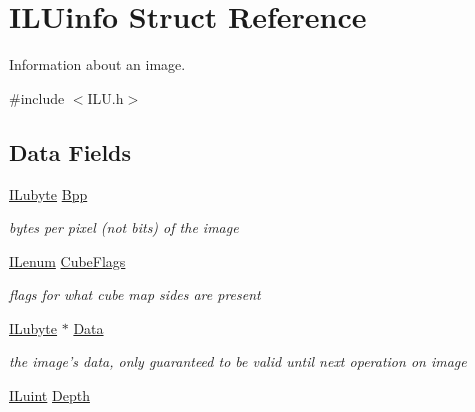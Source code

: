 \hypertarget{struct_i_l_uinfo}{\section{I\+L\+Uinfo Struct Reference}
\label{struct_i_l_uinfo}
}


Information about an image.  




{\ttfamily \#include $<$I\+L\+U.\+h$>$}

\subsection*{Data Fields}
\begin{DoxyCompactItemize}
\item 
\hypertarget{struct_i_l_uinfo_acb619433784a0e26c0f1f18b3700c9f7}{\hyperlink{group__il__types_ga057357939bc5a12e8061715453568519}{I\+Lubyte} \hyperlink{struct_i_l_uinfo_acb619433784a0e26c0f1f18b3700c9f7}{Bpp}}\label{struct_i_l_uinfo_acb619433784a0e26c0f1f18b3700c9f7}

\begin{DoxyCompactList}\small\item\em bytes per pixel (not bits) of the image \end{DoxyCompactList}\item 
\hypertarget{struct_i_l_uinfo_a2141dcf3ce36303a8c31d417d9337034}{\hyperlink{group__il__types_ga62ca73445716183ef42b1f3906a45ed0}{I\+Lenum} \hyperlink{struct_i_l_uinfo_a2141dcf3ce36303a8c31d417d9337034}{Cube\+Flags}}\label{struct_i_l_uinfo_a2141dcf3ce36303a8c31d417d9337034}

\begin{DoxyCompactList}\small\item\em flags for what cube map sides are present \end{DoxyCompactList}\item 
\hypertarget{struct_i_l_uinfo_a32fd28ac5d89e3ef2f9151330af0149d}{\hyperlink{group__il__types_ga057357939bc5a12e8061715453568519}{I\+Lubyte} $\ast$ \hyperlink{struct_i_l_uinfo_a32fd28ac5d89e3ef2f9151330af0149d}{Data}}\label{struct_i_l_uinfo_a32fd28ac5d89e3ef2f9151330af0149d}

\begin{DoxyCompactList}\small\item\em the image's data, only guaranteed to be valid until next operation on image \end{DoxyCompactList}\item 
\hypertarget{struct_i_l_uinfo_a2a4c47a9713bee335a0830b336bdc951}{\hyperlink{group__il__types_gaff8e86a1072c8d7cfe387fb87c6ed8e1}{I\+Luint} \hyperlink{struct_i_l_uinfo_a2a4c47a9713bee335a0830b336bdc951}{Depth}}\label{struct_i_l_uinfo_a2a4c47a9713bee335a0830b336bdc951}


\end{DoxyCompactItemize}
